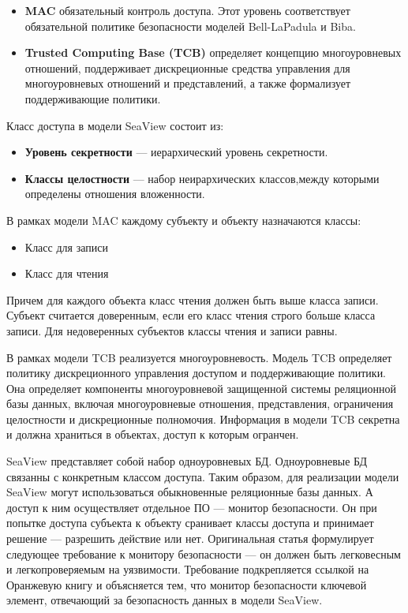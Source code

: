 \begin{itemize}
    \item \textbf{MAC}
    обязательный контроль доступа. Этот уровень соответствует обязательной политике безопасности моделей Bell-LaPadula и Biba.
    \item \textbf{Trusted Computing Base (TCB)}
    определяет концепцию многоуровневых отношений, поддерживает дискреционные средства управления для многоуровневых отношений и представлений, а также формализует поддерживающие политики.
\end{itemize}

Класс доступа в модели SeaView состоит из:

\begin{itemize}
    \item \textbf{Уровень секретности} --- иерархический уровень секретности.
    \item \textbf{Классы целостности} --- набор неирархических классов,между которыми определены отношения вложенности.
\end{itemize}

В рамках модели MAC каждому субъекту и объекту назначаются классы:

\begin{itemize}
    \item Класс для записи
    \item Класс для чтения
\end{itemize}

Причем для каждого объекта класс чтения должен быть выше класса записи. Субъект считается доверенным, если его класс чтения строго больше класса записи. Для недоверенных субъектов классы чтения и записи равны.

В рамках модели TCB реализуется многоуровневость.  Модель TCB определяет политику дискреционного управления доступом и поддерживающие политики. Она определяет компоненты многоуровневой защищенной системы реляционной базы данных, включая многоуровневые отношения, представления, ограничения целостности и дискреционные полномочия. Информация в модели TCB секретна и должна храниться в объектах, доступ к которым огранчен.

SeaView представляет собой набор одноуровневых БД.  Одноуровневые БД связанны с конкретным классом доступа. Таким образом, для реализации модели SeaView могут использоваться обыкновенные реляционные базы данных. А доступ к ним осуществляет отдельное ПО --- монитор безопасности.  Он при попытке доступа субъекта к объекту сранивает классы доступа и принимает решение --- разрешить действие или нет. Оригинальная статья формулирует следующее требование к монитору безопасности --- он должен быть легковесным и легкопроверяемым на уязвимости. Требование подкрепляется ссылкой на Оранжевую книгу и объясняется тем, что монитор безопасности ключевой элемент, отвечающий за безопасность данных в модели SeaView.


